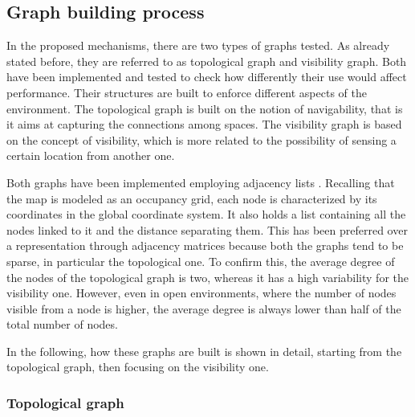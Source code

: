 \subsection{Graph building process}

In the proposed mechanisms, there are two types of graphs tested.
As already stated before, they are referred to as topological graph
and visibility graph. Both have been implemented and tested to check
how differently their use would affect performance. Their structures
are built to enforce different aspects of the environment. The topological
graph is built on the notion of navigability, that is it aims at capturing
the connections among spaces. The visibility graph is based on the
concept of visibility, which is more related to the possibility of
sensing a certain location from another one.

Both graphs have been implemented employing adjacency lists \cite{Cormen2010}. 
Recalling that the map is modeled as an occupancy grid, each node is characterized
by its coordinates in the global coordinate system. It also holds a list 
containing all the nodes linked to it and the distance separating them. 
This has been preferred over a representation through adjacency matrices because
both the graphs tend to be sparse, in particular the topological one.
To confirm this, the average degree of the nodes of the topological
graph is two, whereas it has a high variability for the visibility
one. However, even in open environments, where the number of nodes
visible from a node is higher, the average degree is always lower
than half of the total number of nodes. 

In the following, how these graphs are built is shown in detail, starting
from the topological graph, then focusing on the visibility one. 

\subsubsection{Topological graph}

